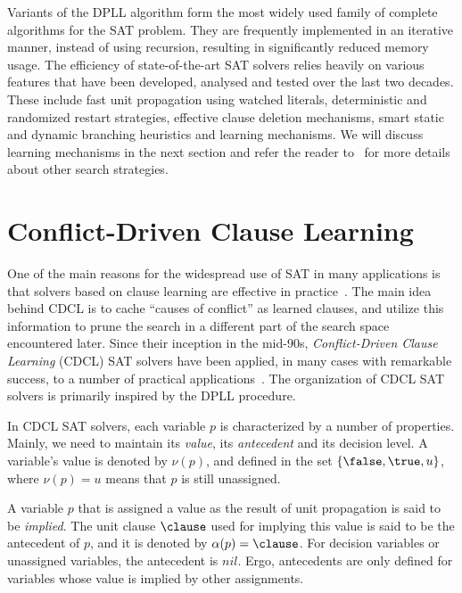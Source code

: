 Variants of the DPLL algorithm form the most widely used family of complete
algorithms for the SAT problem. They are frequently implemented in an iterative
manner, instead of using recursion, resulting in significantly reduced memory
usage. The efficiency of state-of-the-art SAT solvers relies heavily on various
features that have been developed, analysed and tested over the last two
decades. These include fast unit propagation using watched literals,
deterministic and randomized restart strategies, effective clause deletion
mechanisms, smart static and dynamic branching heuristics and learning
mechanisms. We will discuss learning mechanisms in the next section and refer
the reader to~\cite{satchapter} for more details about other search strategies.

\section{Conflict-Driven Clause Learning}%
\label{sec:cdcl}

One of the main reasons for the widespread use of SAT in many applications is
that solvers based on clause learning are effective in
practice~\cite{satchapter}. The main idea behind CDCL is to cache ``causes of
conflict'' as learned clauses, and utilize this information to prune the search
in a different part of the search space encountered later. Since their inception
in the mid-90s, \emph{Conflict-Driven Clause Learning} (CDCL) SAT solvers have
been applied, in many cases with remarkable success, to a number of practical
applications~\cite{cdclchapter}. The organization of CDCL SAT solvers is
primarily inspired by the DPLL procedure.

In CDCL SAT solvers, each variable $p$ is characterized by a number of
properties. Mainly, we need to maintain its \emph{value}, its \emph{antecedent}
and its decision level.  A variable's value is denoted by $\nu(p)$, and defined
in the set $\{\false, \true, u\}$, where $\nu(p) = u$ means that $p$ is still
unassigned. 

A variable $p$ that is assigned a value as the result of unit propagation is
said to be \emph{implied}.  The unit clause $\clause$ used for implying this
value is said to be the antecedent of $p$, and it is denoted by $\alpha(p) =
\clause$. For decision variables or unassigned variables, the antecedent is
$nil$. Ergo, antecedents are only defined for variables whose value is implied
by other assignments. 

